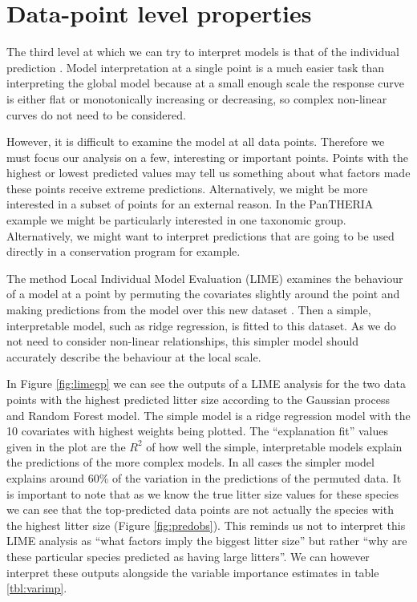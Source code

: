 \documentclass[12pt]{article}
\begin{document}
\section{Data-point level properties}\label{data-point-level-properties}

The third level at which we can try to interpret models is that of the individual prediction \citep{lime, ribeiro2016should, lundberg2017unified, ribeiro2016nothing}.
Model interpretation at a single point is a much easier task than interpreting the global model because at a small enough scale the response curve is either flat or monotonically increasing or decreasing, so complex non-linear curves do not need to be considered.

However, it is difficult to examine the model at all data points.
Therefore we must focus our analysis on a few, interesting or important points.
Points with the highest or lowest predicted values may tell us something about what factors made these points receive extreme predictions.
Alternatively, we might be more interested in a subset of points for an external reason.
In the PanTHERIA example we might be particularly interested in one taxonomic group.
Alternatively, we might want to interpret predictions that are going to be used directly in a conservation program for example.

The method Local Individual Model Evaluation (LIME) examines the behaviour of a model at a point by  permuting the covariates slightly around the point and making predictions from the model over this new dataset \citep{lime, ribeiro2016should, lundberg2017unified, ribeiro2016nothing}.
Then a simple, interpretable model, such as ridge regression, is fitted to this dataset.
As we do not need to consider non-linear relationships, this simpler model should accurately describe the behaviour at the local scale.

In Figure \ref{fig:limegp} we can see the outputs of a LIME analysis for the two data points with the highest predicted litter size according to the Gaussian process and Random Forest model.
The simple model is a ridge regression model with the 10 covariates with highest weights being plotted.
The ``explanation fit'' values given in the plot are the $R^2$ of how well the simple, interpretable models explain the predictions of the more complex models.
In all cases the simpler model explains around 60\% of the variation in the predictions of the permuted data.
It is important to note that as we know the true litter size values for these species we can see that the top-predicted data points are not actually the species with the highest litter size (Figure \ref{fig:predobs}).
This reminds us not to interpret this LIME analysis as ``what factors imply the biggest litter size'' but rather ``why are these particular species predicted as having large litters''.
We can however interpret these outputs alongside the variable importance estimates in table \ref{tbl:varimp}.
\end{document}
